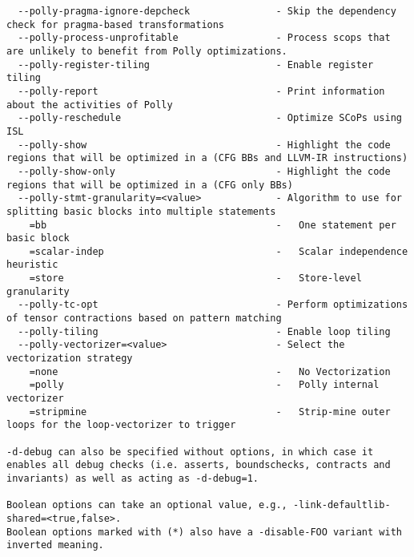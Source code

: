 \documentclass[732]{studrep}
\begin{document}
\begin{verbatim}
  --polly-pragma-ignore-depcheck               - Skip the dependency check for pragma-based transformations
  --polly-process-unprofitable                 - Process scops that are unlikely to benefit from Polly optimizations.
  --polly-register-tiling                      - Enable register tiling
  --polly-report                               - Print information about the activities of Polly
  --polly-reschedule                           - Optimize SCoPs using ISL
  --polly-show                                 - Highlight the code regions that will be optimized in a (CFG BBs and LLVM-IR instructions)
  --polly-show-only                            - Highlight the code regions that will be optimized in a (CFG only BBs)
  --polly-stmt-granularity=<value>             - Algorithm to use for splitting basic blocks into multiple statements
    =bb                                        -   One statement per basic block
    =scalar-indep                              -   Scalar independence heuristic
    =store                                     -   Store-level granularity
  --polly-tc-opt                               - Perform optimizations of tensor contractions based on pattern matching
  --polly-tiling                               - Enable loop tiling
  --polly-vectorizer=<value>                   - Select the vectorization strategy
    =none                                      -   No Vectorization
    =polly                                     -   Polly internal vectorizer
    =stripmine                                 -   Strip-mine outer loops for the loop-vectorizer to trigger

-d-debug can also be specified without options, in which case it enables all debug checks (i.e. asserts, boundschecks, contracts and invariants) as well as acting as -d-debug=1.

Boolean options can take an optional value, e.g., -link-defaultlib-shared=<true,false>.
Boolean options marked with (*) also have a -disable-FOO variant with inverted meaning.
\end{verbatim}
\end{document}
